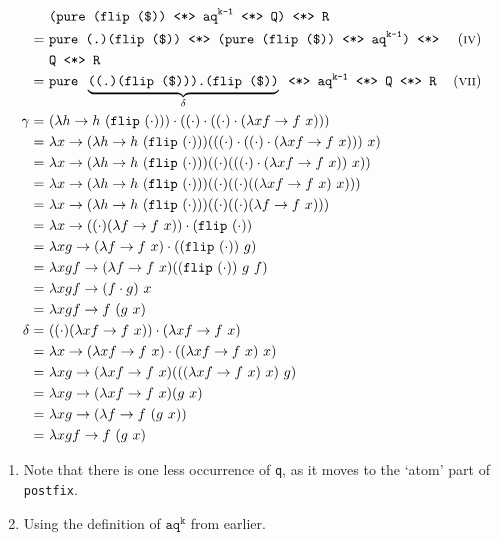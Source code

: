 \begin{align*}
    & \texttt{(pure (flip (\$)) \ap aq}^\texttt{k-1}\texttt{ \ap Q) \ap R} \\
    =\ & \texttt{pure (.)(flip (\$)) \ap (pure (flip (\$)) \ap aq}^\texttt{k-1}\texttt{) \ap} & \equi[4] \\
    & \texttt{Q \ap R} \\
    =\ & \texttt{pure }\underbrace{\texttt{((.)(flip (\$))).(flip (\$))}}_{\delta}\texttt{ \ap aq}^\texttt{k-1}\texttt{ \ap Q \ap R} & \equi[7] \\
    \gamma =\ & (\lambda h \to h\ (\texttt{flip}\ (\cdot))) \cdot ((\cdot) \cdot ((\cdot) \cdot (\lambda xf \to f\ x))) \\
    =\ & \lambda x \to (\lambda h \to h\ (\texttt{flip}\ (\cdot))) (((\cdot) \cdot ((\cdot) \cdot (\lambda xf \to f\ x)))\ x) \\
    =\ & \lambda x \to (\lambda h \to h\ (\texttt{flip}\ (\cdot))) ((\cdot) (((\cdot) \cdot (\lambda xf \to f\ x))\ x )) \\
    =\ & \lambda x \to (\lambda h \to h\ (\texttt{flip}\ (\cdot))) ((\cdot) ((\cdot) ((\lambda xf \to f\ x)\ x))) \\
    =\ & \lambda x \to (\lambda h \to h\ (\texttt{flip}\ (\cdot))) ((\cdot) ((\cdot) (\lambda f \to f\ x))) \\
    =\ & \lambda x \to ((\cdot) (\lambda f \to f\ x)) \cdot (\texttt{flip}\ (\cdot)) \\
    =\ & \lambda xg \to (\lambda f \to f\ x) \cdot ((\texttt{flip}\ (\cdot))\ g) \\
    =\ & \lambda xgf \to (\lambda f \to f\ x) ((\texttt{flip}\ (\cdot))\ g\ f) \\
    =\ & \lambda xgf \to (f \cdot g)\ x \\
    =\ & \lambda xgf \to f\ (g\ x) \\
    \delta =\ & ((\cdot) (\lambda xf \to f\ x)) \cdot (\lambda xf \to f\ x) \\
    =\ & \lambda x \to (\lambda xf \to f\ x) \cdot ((\lambda xf \to f\ x)\ x) \\
    =\ & \lambda xg \to (\lambda xf \to f\ x) (((\lambda xf \to f\ x)\ x)\ g) \\
    =\ & \lambda xg \to (\lambda xf \to f\ x) (g\ x) \\
    =\ & \lambda xg \to (\lambda f \to f\ (g\ x)) \\
    =\ & \lambda xgf \to f\ (g\ x)
\end{align*}
\begin{enumerate}[(1)]
    \itemsep0em
    \item Note that there is one less occurrence of \texttt{q}, as it moves to the `atom' part of \texttt{postfix}.
    \item Using the definition of $\texttt{aq}^\texttt{k}$ from earlier.
\end{enumerate}


